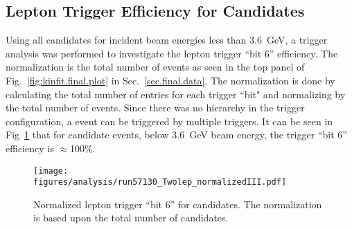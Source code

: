 \subsection{Lepton Trigger Efficiency for \pizT Candidates}\label{sec:analysis.trigger.verify}
	Using all \pizT candidates for incident beam energies less than 3.6~GeV, a trigger analysis was performed to investigate the lepton trigger ``bit 6'' efficiency. The normalization is the total number of \pizT events as seen in the top panel of Fig.~\ref{fig:kinfit.final.plot} in Sec.~\ref{sec.final.data}. The normalization is done by calculating the total number of entries for each trigger ``bit" and normalizing by the total number of events. Since there was no hierarchy in the trigger configuration, a event can be triggered by multiple triggers. It can be seen in Fig~\ref{fig:Leptrigger} that for \pizT candidate events, below 3.6~GeV beam energy, the trigger ``bit 6'' efficiency is $\approx$100\%.
							
	\begin{figure}[h!]\begin{center}
		\texttt{[image: \\figures/analysis/run57130\_Twolep\_normalizedIII.pdf]}
		\caption[Normalized Lepton Trigger ``Bit 6'' for \piz candidates]{\label{fig:Leptrigger}Normalized lepton trigger ``bit 6'' for \pizT candidates. The normalization is based upon the total number of \pizT candidates.}
	\end{center}\end{figure} 